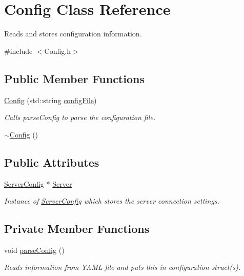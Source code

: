 \hypertarget{classConfig}{\section{Config Class Reference}
\label{classConfig}
}


Reads and stores configuration information.  




{\ttfamily \#include $<$Config.\-h$>$}

\subsection*{Public Member Functions}
\begin{DoxyCompactItemize}
\item 
\hyperlink{classConfig_ae67e338ea42e242cb5b374b6583c8b1c}{Config} (std\-::string \hyperlink{classConfig_a08b7b2c4eadf7dda51404f76fd6e0280}{config\-File})
\begin{DoxyCompactList}\small\item\em Calls parse\-Config to parse the configuration file. \end{DoxyCompactList}\item 
\hyperlink{classConfig_a543dce59b66475c5108088ee4ce1cdfc}{$\sim$\-Config} ()
\end{DoxyCompactItemize}
\subsection*{Public Attributes}
\begin{DoxyCompactItemize}
\item 
\hyperlink{structServerConfig}{Server\-Config} $\ast$ \hyperlink{classConfig_a249a19a298cdcfd4223609142e15e5de}{Server}
\begin{DoxyCompactList}\small\item\em Instance of \hyperlink{structServerConfig}{Server\-Config} which stores the server connection settings. \end{DoxyCompactList}\end{DoxyCompactItemize}
\subsection*{Private Member Functions}
\begin{DoxyCompactItemize}
\item 
void \hyperlink{classConfig_a2ddcecec4284da0fb0b53da77e0d217a}{parse\-Config} ()
\begin{DoxyCompactList}\small\item\em Reads information from Y\-A\-M\-L file and puts this in configuration struct(s). \end{DoxyCompactList}\end{DoxyCompactItemize}
